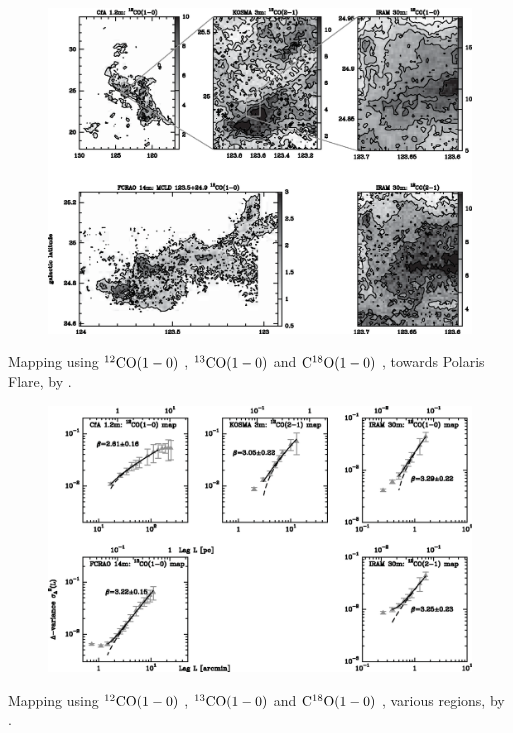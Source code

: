 \documentclass[12pt]{article}
\newcommand{\coaa}{$\rm^{12}CO(1-0)$ }
\newcommand{\cobb}{$\rm^{13}CO(1-0)$ }
\newcommand{\cocc}{$\rm C^{18}O(1-0)$ }
\begin{document}
            \begin{figure}[hb]
              \centering
              \includegraphics[totalheight=80 mm]{img/Bensch_2001_regionmaps.eps}
            \end{figure} 
        \clearpage
        \begin{small}
        Mapping using \coaa, \cobb and \cocc, towards Polaris Flare, by \cite{2001A&A...366..636B}.
        \end{small}
            \begin{figure}[hb]
              \centering
              \includegraphics[totalheight=80 mm]{img/Bensch_2001_fivetelescopes.eps}
            \end{figure} 
        \clearpage
        \begin{small}
        Mapping using \coaa, \cobb and \cocc, various regions, by \cite{2001A&A...366..636B}.
        \end{small}
\end{document}
